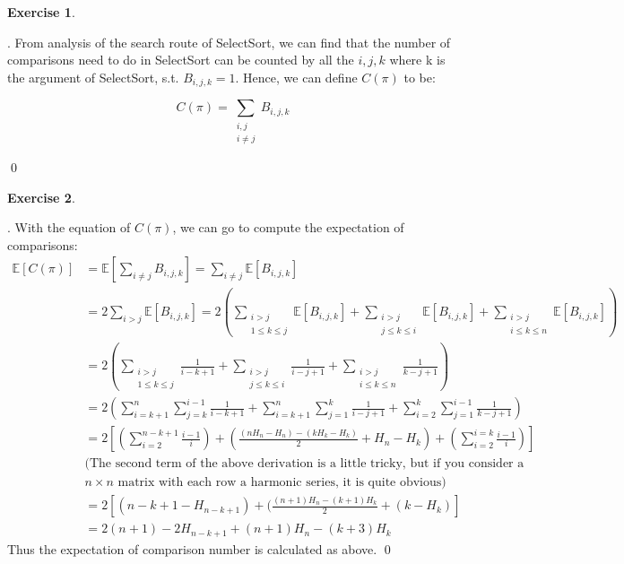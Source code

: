 \documentclass[12pt, notitlepage]{article}
\newtheorem{ex}{Exercise}
\newenvironment{sol}
  {\par\vspace{3mm}\noindent{\it Solution}.}{\qed}
\begin{document}
\begin{ex}\end{ex}
\begin{sol}
From analysis of the search route of SelectSort, we can find that the number of comparisons need to do in SelectSort can be counted by all the $i, j, k$ where k is the argument of SelectSort, s.t. $B_{i, j, k} = 1$. Hence, we can define $C(\pi)$ to be:

\[
C(\pi) = \sum_{\substack{i, j\\i\neq j}} B_{i, j, k}
\]

\end{sol}


\begin{ex}\end{ex}
\begin{sol}
With the equation of $C(\pi)$, we can go to compute the expectation of comparisons:
\begin{align*}
\mathbb{E}[C(\pi)] &= \mathbb{E}\left[\sum_{i\neq j} B_{i, j, k}\right] = \sum_{i\neq j}\mathbb{E}[B_{i, j, k}]\\
&= 2 \sum_{i > j}  \mathbb{E}[B_{i, j, k}] = 2(\sum_{\substack{i>j\\1\leq k\leq j}}\mathbb{E}[B_{i, j, k}] + \sum_{\substack{i>j\\j\leq k\leq i}}\mathbb{E}[B_{i, j, k}] + \sum_{\substack{i>j\\i\leq k\leq n}}\mathbb{E}[B_{i, j, k}])  \\
&= 2(\sum_{\substack{i>j\\1\leq k\leq j}}\frac{1}{i-k+1} + \sum_{\substack{i>j\\j\leq k\leq i}}\frac{1}{i - j + 1} + \sum_{\substack{i>j\\i\leq k\leq n}} \frac{1}{k - j + 1}) \\
&=2(\sum_{i = k+1}^{n}\sum_{j=k}^{i-1}\frac{1}{i-k+1}  +  \sum_{i = k+1}^{n}\sum_{j=1}^{k}\frac{1}{i-j+1}       +
\sum_{i=2}^{k}\sum_{j=1}^{i-1}\frac{1}{k-j+1}) \\
&=2\left[ (\sum_{i = 2}^{n-k+1}\frac{i-1}{i}) +
		   (\frac{(n H_n - H_n) - (k H_k - H_k)}{2} + H_n - H_k) + (\sum_{i = 2}^{i = k}\frac{i-1}{i})\right]\\
&\text{(The second term of the above derivation is a little tricky, but if you consider a }\\
&\text{$n\times n$ matrix with each row a harmonic series, it is quite obvious)}\\
& = 2\left[(n-k+1-H_{n-k+1}) + (\frac{(n+1)H_n - (k+1)H_k}{2} + (k-H_k)\right] \\
&= 2(n+1) - 2H_{n-k+1} +(n+1)H_n - (k+3)H_k
\end{align*}
Thus the expectation of comparison number is calculated as above.
\end{sol}
\end{document}
